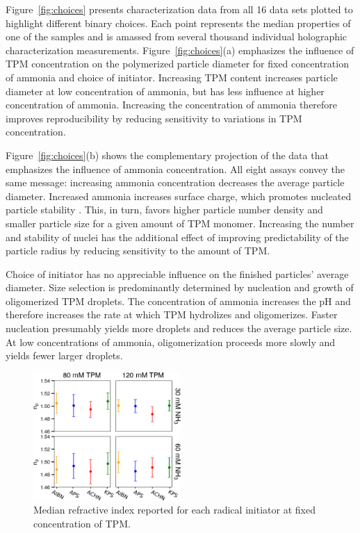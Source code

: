 \documentclass[journal=langd5,manuscript=article]{achemso}
\begin{document}
Figure~\ref{fig:choices} presents
characterization data from all \num{16} data sets plotted to highlight different
binary choices.
Each point represents the median properties of
one of the samples and is amassed 
from several thousand
individual holographic characterization measurements.
Figure~\ref{fig:choices}(a) 
emphasizes the influence of TPM concentration
on the polymerized particle diameter
for fixed concentration of 
ammonia and choice 
of initiator.
Increasing TPM content increases particle
diameter at low concentration of ammonia,
but has less influence at higher concentration
of ammonia.
Increasing the concentration of 
ammonia
therefore improves reproducibility by 
reducing sensitivity to variations in TPM concentration.

Figure~\ref{fig:choices}(b) shows the complementary projection
of the data that emphasizes the influence of
ammonia concentration. 
All eight assays convey the same message:
increasing ammonia concentration
decreases the average particle diameter.
Increased ammonia increases surface charge, 
which promotes nucleated particle stability \cite{vanderwel17}. 
This, in turn, favors higher particle number density 
and smaller particle size for a given amount of TPM monomer.
Increasing the number and stability of nuclei 
has the additional effect of improving predictability
of the particle radius by reducing sensitivity to the amount
of TPM.

Choice of initiator has no appreciable 
influence on the finished particles'
average diameter.
Size selection is predominantly 
determined by nucleation and growth of
oligomerized TPM droplets.
The concentration of ammonia increases the pH and
therefore increases the rate at which TPM hydrolizes and oligomerizes.
Faster nucleation
presumably yields more droplets and reduces the average particle size.
At low concentrations of ammonia, 
oligomerization proceeds more slowly
and yields fewer larger droplets.

\begin{figure}
    \centering
    \includegraphics[width=0.5\textwidth]{longitudinal_np_02}
    \caption{Median refractive index reported for each radical initiator
    at fixed concentration of TPM.}
    \label{fig:longitudinal_np}
\end{figure}
\end{document}
